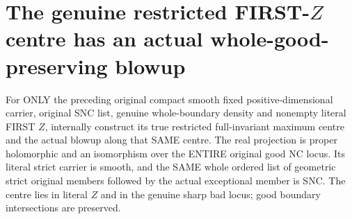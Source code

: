 \section{The genuine restricted FIRST-$Z$ centre has an actual whole-good-preserving blowup}

\begin{theorem}
\label{hir:sharp-original-restricted-distinct-defect-actual-first-blowup}
\leanok
For ONLY the preceding original compact smooth fixed positive-dimensional
carrier, original SNC list, genuine whole-boundary density and nonempty
literal FIRST $Z$, internally construct its true restricted full-invariant
maximum centre and the actual blowup along that SAME centre. The real
projection is proper holomorphic and an isomorphism over the ENTIRE original
good NC locus. Its literal strict carrier is smooth, and the SAME whole ordered
list of geometric strict original members followed by the actual exceptional
member is SNC. The centre lies in literal $Z$ and in the genuine sharp bad
locus; good boundary intersections are preserved.
\end{theorem}
